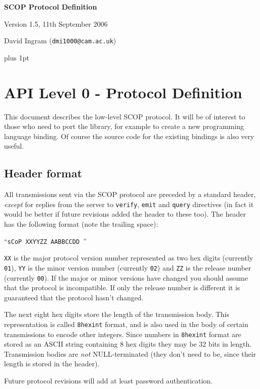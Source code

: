 \documentclass[12pt,a4paper,twoside]{article}
\renewcommand{\_}{\texttt{\symbol{95}}}
\begin{document}
\centerline{\textbf{\LARGE SCOP Protocol Definition}}
\vspace{0.5cm}
\centerline{Version 1.5, 11th September 2006}
\centerline{David Ingram (\texttt{dmi1000@cam.ac.uk})}

{ \parskip 1mm plus 1pt \tableofcontents }

\section{API Level 0 - Protocol Definition}

This document describes the low-level SCOP protocol. It will
be of interest to those who need to port the library, for example
to create a new programming language binding. Of course the source
code for the existing bindings is also very useful.

\subsection{Header format}

All transmissions sent via the SCOP protocol are preceded by a
standard header,
\textit{except} for replies from the server to
\texttt{verify}, \texttt{emit} and \texttt{query}
directives (in fact it would be better if future revisions
added the header to these too).
The header has the following format (note the trailing space):

``\texttt{sCoP XXYYZZ AABBCCDD }''

\texttt{XX} is the major protocol version number represented as two
hex digits (currently \texttt{01}),
\texttt{YY} is the minor version number (currently \texttt{02})
and \texttt{ZZ} is the release number (currently \texttt{00}).
If the major or minor versions have changed you should assume
that the protocol is incompatible. If only the release number
is different it is guaranteed that the protocol hasn't changed.

The next eight hex digits store the length of the transmission body.
This representation is called \texttt{8hexint} format, and is also used
in the body of certain transmissions to encode other integers. Since
numbers in \texttt{8hexint} format are stored as an ASCII string
containing 8 hex digits they may be 32 bits in length.
Transmission bodies are \textit{not} NULL-terminated (they don't need to be,
since their length is stored in the header).

Future protocol revisions will add at least password authentication.
\end{document}
